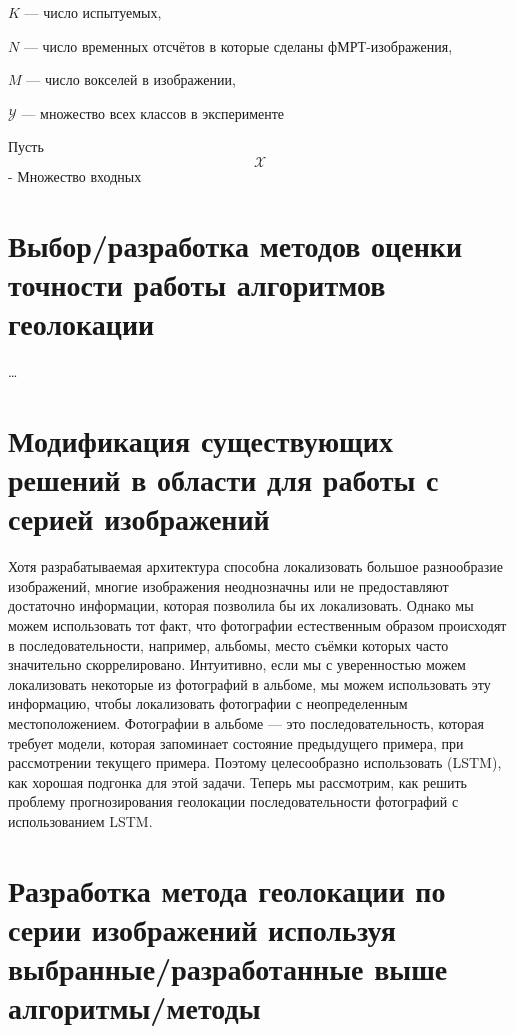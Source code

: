 \begin{compactitem}
	
	\item $K$ --- число испытуемых,
	\item $N$ --- число временных отсчётов в которые сделаны фМРТ-изображения,
	\item $M$ --- число вокселей в изображении,
	\item $\mathcal{Y}$ --- множество всех классов в эксперименте
	
\end{compactitem}
Пусть \[\mathcal{X}\] - Множество входных

\section{Выбор/разработка методов оценки точности работы алгоритмов геолокации}

\dots


\section{Модификация существующих решений в области для работы с серией изображений}

Хотя разрабатываемая архитектура способна локализовать большое разнообразие изображений, многие изображения неоднозначны или не предоставляют достаточно информации, которая позволила бы их локализовать.
Однако мы можем использовать тот факт, что фотографии естественным образом происходят в последовательности, например, альбомы, место съёмки которых часто значительно скоррелировано. Интуитивно, если мы с уверенностью можем локализовать
некоторые из фотографий в альбоме, мы можем использовать эту информацию,
чтобы локализовать фотографии с неопределенным местоположением. Фотографии в альбоме --- это последовательность,
которая требует модели, которая запоминает состояние предыдущего примера, 
при рассмотрении текущего примера. Поэтому целесообразно использовать
(LSTM), как хорошая подгонка для этой задачи.
Теперь мы рассмотрим, как решить проблему прогнозирования
геолокации последовательности фотографий с использованием LSTM.



\section{Разработка метода геолокации по серии изображений используя выбранные/разработанные выше алгоритмы/методы}

